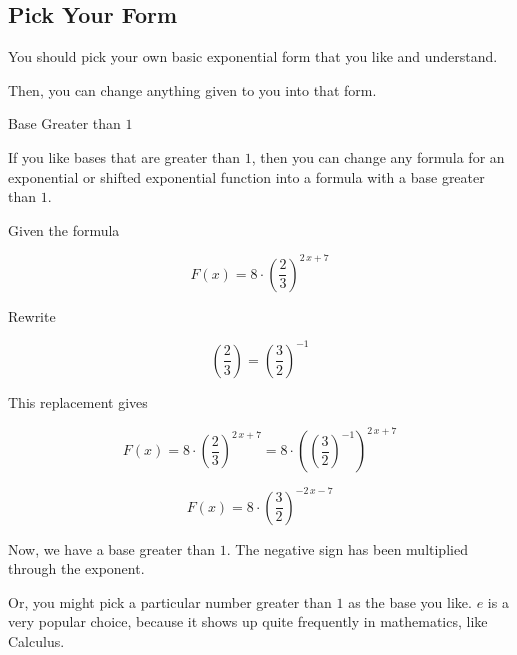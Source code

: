 \documentclass{ximera}
\begin{document}
\subsection*{Pick Your Form}

You should pick your own basic exponential form that you like and understand.  

Then, you can change anything given to you into that form.









\begin{example} Base Greater than $1$


If you like bases that are greater than $1$, then you can change any formula for an exponential or shifted exponential function into a formula with a base greater than $1$. 


Given the formula 

\[
F(x) = 8 \cdot \left( \frac{2}{3} \right)^{2 \, x + 7}
\]



Rewrite 

\[
\left( \frac{2}{3} \right) = \left( \frac{3}{2} \right)^{-1}
\]


This replacement gives 



\[
F(x) = 8 \cdot \left( \frac{2}{3} \right)^{2 \, x + 7} = 8 \cdot \left( \left( \frac{3}{2} \right)^{-1} \right)^{2 \, x + 7}
\]

\[
F(x) = 8 \cdot \left( \frac{3}{2} \right)^{-2 \, x - 7}
\]


Now, we have a base greater than $1$.  The negative sign has been multiplied through the exponent.


\end{example}



Or, you might pick a particular number greater than $1$ as the base you like.  $e$ is a very popular choice, because it shows up quite frequently in mathematics, like Calculus.
\end{document}
